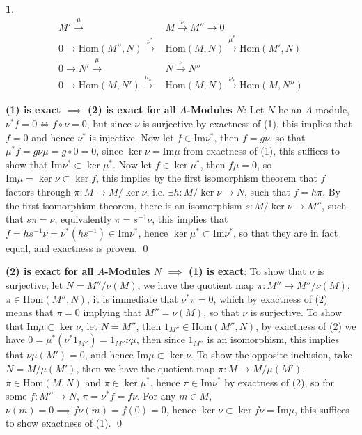 \documentclass[11pt]{article}
\theoremstyle{definition}
\newtheorem{pb}{}
\newcommand{\ho}{\text{Hom}}
\begin{document}
    \begin{pb}
        \begin{align}
            M' \overset{\mu}{\longrightarrow} &M \overset{\nu}{\longrightarrow} M'' \to 0 \\
            0 \to \ho(M'',N) \overset{\nu^*}{\longrightarrow}&\ho(M,N)\overset{\mu^*}{\longrightarrow}\ho(M',N) \\
            0 \to N' \overset{\mu}{\longrightarrow} &N \overset{\nu}{\longrightarrow} N'' \\
            0 \to \ho(M,N') \overset{\mu_*}{\longrightarrow} &\ho(M,N) \overset{\nu_*}{\longrightarrow} \ho(M,N'')
        \end{align}

        \textbf{(1) is exact \(\mathbf{\implies}\) (2) is exact for all \(A\)-Modules \(N\)}: Let \(N\) be an \(A\)-module, \(\nu^*f = 0 \iff f \circ \nu = 0\), but since \(\nu\) is surjective by exactness of (1), this implies that \(f = 0\) and hence \(\nu^*\) is injective. Now let \(f \in \text{Im}\nu^*\), then \(f = g\nu\), so that \(\mu^*f = g\nu\mu  = g \circ 0 = 0\), since \(\ker \nu = \text{Im} \mu\) from exactness of (1), this suffices to show that \(\text{Im} \nu^* \subset \ker \mu^*\). Now let \(f \in \ker \mu^*\), then \(f \mu = 0\), so \(\text{Im}\mu = \ker \nu \subset \ker f\), this implies by the first isomorphism theorem that \(f\) factors through \(\pi: M \to M/\ker\nu\), i.e. \(\exists h : M/\ker\nu \to N\), such that \(f = h \pi\). By the first isomorphism theorem, there is an isomorphism \(s: M/\ker \nu \to M''\), such that \(s \pi = \nu\), equivalently \(\pi = s^{-1}\nu\), this implies that \(f = hs^{-1}\nu = \nu^*(hs^{-1})\in \text{Im}\nu^*\), hence \(\ker \mu^* \subset \text{Im}\nu^*\), so that they are in fact equal, and exactness is proven. \qed

        \textbf{(2) is exact for all \(A\)-Modules \(N\) \(\mathbf{\implies}\) (1) is exact}:
        To show that \(\nu\) is surjective, let \(N = M''/\nu(M)\), we have the quotient map \(\pi: M'' \to M''/\nu(M)\), \(\pi \in \ho(M'',N)\), it is immediate that \(\nu^*\pi = 0\), which by exactness of (2) means that \(\pi = 0\) implying that \(M'' = \nu(M)\), so that \(\nu\) is surjective. To show that \(\text{Im}\mu \subset \ker \nu\), let \(N = M''\), then \(1_{M''} \in \ho(M'',N)\), by exactness of (2) we have \(0 = \mu^*(\nu^*1_{M''}) = 1_{M''}\nu \mu\), then since \(1_{M''}\) is an isomorphism, this implies that \(\nu\mu(M') = 0\), and hence \(\text{Im}\mu \subset \ker \nu\). To show the opposite inclusion, take \(N = M/\mu(M')\), then we have the quotient map \(\pi: M \to M/\mu(M')\), \(\pi \in \ho(M,N)\) and \(\pi \in \ker \mu^*\), hence \(\pi \in \text{Im}\nu^*\) by exactness of (2), so for some \(f: M'' \to N\), \(\pi = \nu^*f = f\nu\). For any \(m \in M\), \(\nu(m) = 0 \implies f\nu(m) = f(0) = 0\), hence \(\ker \nu \subset \ker f\nu = \text{Im}\mu\), this suffices to show exactness of (1). \qed


\end{pb}
\end{document}
